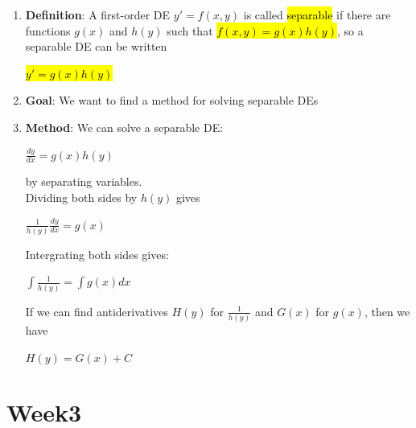 \documentclass{article}
\begin{document}
  \begin{enumerate}
    \item \textbf{Definition}: A first-order DE $y' = f(x,y)$ is called \hl{separable} if there are functions $g(x)$ and $h(y)$ such that \hl{$f(x,y) = g(x)h(y)$}, so a separable DE can be written
    \begin{center}
      \hl{$y' = g(x)h(y)$}
    \end{center}

    \item \textbf{Goal}: We want to find a method for solving separable DEs

    \item \textbf{Method}: We can solve a separable DE:
      \begin{center}
        $\frac{dy}{dx} = g(x)h(y)$
      \end{center}
    by separating variables.\\

    Dividing both sides by $h(y)$ gives 
      \begin{center}
        $\frac{1}{h(y)} \frac{dy}{dx} = g(x)$
      \end{center}

    Intergrating both sides gives:
      \begin{center}
        $\int \frac{1}{h(y)} = \int g(x) dx$ 
      \end{center}

    If we can find antiderivatives $H(y)$ for $\frac{1}{h(y)}$ and $G(x)$ for $g(x)$, then we have
      \begin{center}
        $H(y) = G(x) + C$ 
      \end{center}
  \end{enumerate}

  \section{Week3}
\end{document}
